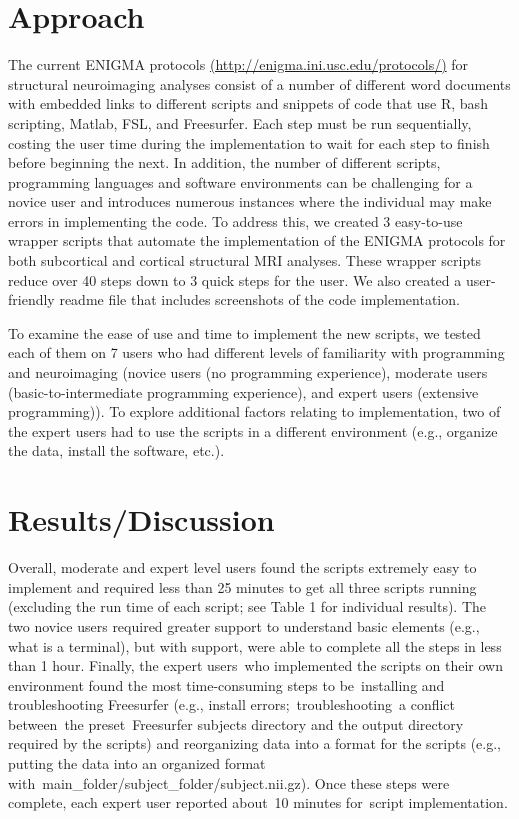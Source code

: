 \documentclass[twocolumn]{bmcart}%
\begin{document}
\section{Approach}\label{approach}

The current ENIGMA protocols \url{(http://enigma.ini.usc.edu/protocols/)} for
structural neuroimaging analyses consist of a number of different word
documents with embedded links to different scripts and snippets of code
that use R, bash scripting, Matlab, FSL, and Freesurfer. Each step must
be run sequentially, costing the user time during the implementation to
wait for each step to finish before beginning the next. In addition, the
number of different scripts, programming languages and software
environments can be challenging for a novice user and introduces
numerous instances where the individual may make errors in implementing
the code. To address this, we created 3 easy-to-use wrapper scripts
that automate the implementation of the ENIGMA protocols for both
subcortical and cortical structural MRI analyses. These wrapper scripts
reduce over 40 steps down to 3 quick steps for the user. We also created
a user-friendly readme file that includes screenshots of the code
implementation.

To examine the ease of use and time to implement the new scripts, we
tested each of them on 7 users who had different levels of familiarity
with programming and neuroimaging (novice users (no programming
experience), moderate users (basic-to-intermediate programming
experience), and expert users (extensive programming)). To explore
additional factors relating to implementation, two of the expert users
had to use the scripts in a different environment (e.g., organize the
data, install the software, etc.).

\section{Results/Discussion}\label{resultsdiscussion}

Overall, moderate and expert level users found the scripts extremely
easy to implement and required less than 25 minutes to get all three
scripts running (excluding the run time of each script; see Table 1 for
individual results). The two novice users required greater support to
understand basic elements (e.g., what is a terminal), but with support,
were able to complete all the steps in less than 1 hour. Finally, the expert users who implemented the scripts on their own environment found the most time-consuming steps to be installing and troubleshooting Freesurfer (e.g., install errors; troubleshooting a conflict between the preset Freesurfer subjects directory and the output directory required by the scripts) and reorganizing data into a format for the scripts (e.g., putting the data into an organized format with main_folder/subject_folder/subject.nii.gz). Once these steps were complete, each expert user reported about 10 minutes for script implementation.
\end{document}
